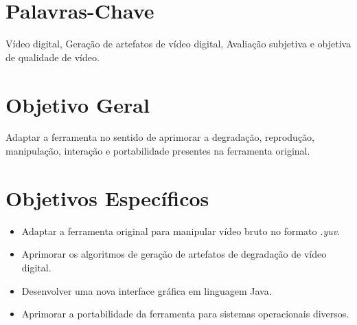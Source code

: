 \section{Palavras-Chave}
Vídeo digital, Geração de artefatos de vídeo digital, Avaliação subjetiva e objetiva de qualidade de vídeo.
\section{Objetivo Geral}
Adaptar a ferramenta  no sentido de aprimorar a degradação, reprodução, manipulação, interação e portabilidade  presentes na ferramenta original.
\section{Objetivos Específicos}
\begin{itemize}
	\item \textbf{} Adaptar a ferramenta original para manipular vídeo bruto no formato \emph{.yuv}.
	\item \textbf{} Aprimorar os algoritmos de geração de artefatos de degradação de vídeo digital.
	\item \textbf{} Desenvolver uma nova interface gráfica em linguagem Java.
	\item \textbf{} Aprimorar a portabilidade da ferramenta para sistemas operacionais diversos.
\end{itemize}
